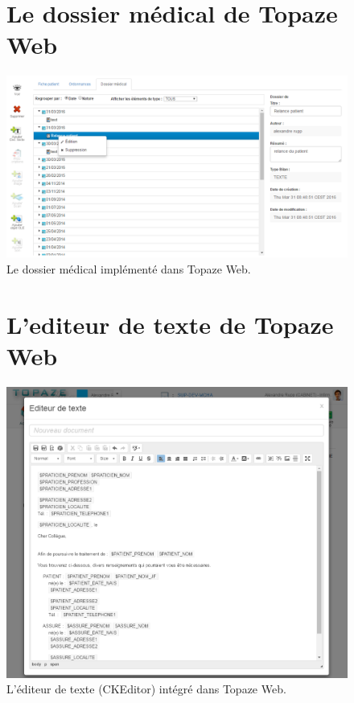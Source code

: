 \begin{appendices}
\begin{figure}[H]
\section*{Le dossier médical de Topaze Web}
  \centering
  \centerline{\includegraphics[width=18cm]{./img/dossier_medical_web2}}
  \caption{\label{fig:dossier_web} Le dossier médical implémenté dans Topaze Web.}
\end{figure}

\newpage
\begin{figure}[H]
\section*{L'editeur de texte de Topaze Web}
  \centering
  \centerline{\includegraphics[width=18cm]{./img/editor2}} %
  \caption{\label{fig:editeur_web} L'éditeur de texte (CKEditor) intégré dans Topaze Web.}
\end{figure}
\newpage
\begin{figure}[H]

\end{figure}
\end{appendices}
